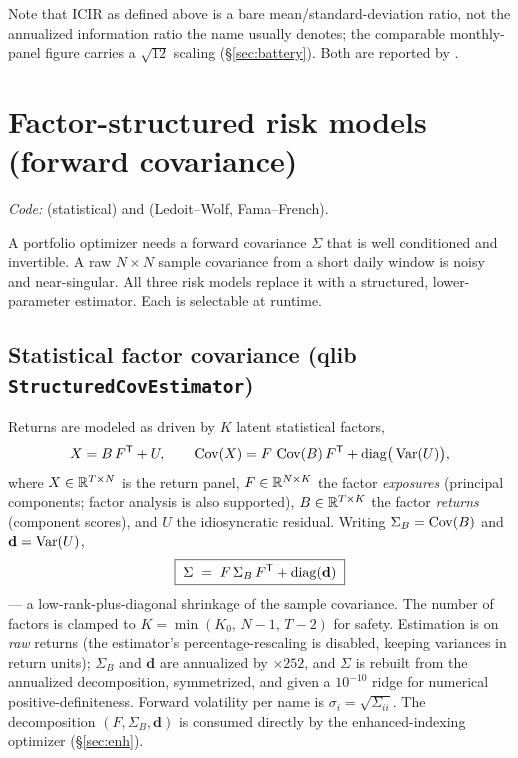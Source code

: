 \documentclass[11pt]{article}
\begin{document}
Note that $\mathrm{ICIR}$ as defined above is a bare mean/standard-deviation ratio, not
the annualized information ratio the name usually denotes; the comparable monthly-panel
figure carries a $\sqrt{12}$ scaling (\S\ref{sec:battery}). Both are reported by
.

\section{Factor-structured risk models (forward covariance)}
\label{sec:risk}
\emph{Code:}  (statistical) and
 (Ledoit--Wolf, Fama--French).

A portfolio optimizer needs a forward covariance $\Sigma$ that is well conditioned
and invertible. A raw $N\times N$ sample covariance from a short daily window is
noisy and near-singular. All three risk models replace it with a structured,
lower-parameter estimator. Each is selectable at runtime.

\subsection{Statistical factor covariance (qlib \texttt{StructuredCovEstimator})}
Returns are modeled as driven by $K$ latent statistical factors,
\begin{equation}
  X = B\,F^{\mathsf{T}} + U, \qquad
  \operatorname{Cov}(X) = F\,\operatorname{Cov}(B)\,F^{\mathsf{T}} + \operatorname{diag}\!\big(\operatorname{Var}(U)\big),
\end{equation}
where $X\in\mathbb{R}^{T\times N}$ is the return panel, $F\in\mathbb{R}^{N\times K}$ the factor
\emph{exposures} (principal components; factor analysis is also supported),
$B\in\mathbb{R}^{T\times K}$ the factor \emph{returns} (component scores), and $U$ the
idiosyncratic residual. Writing $\Sigma_B=\operatorname{Cov}(B)$ and $\mathbf d=\operatorname{Var}(U)$,
\begin{equation}
  \boxed{\;\Sigma \;=\; F\,\Sigma_B\,F^{\mathsf{T}} + \operatorname{diag}(\mathbf d)\;}
\end{equation}
--- a low-rank-plus-diagonal shrinkage of the sample covariance. The number of
factors is clamped to $K=\min(K_0,\,N-1,\,T-2)$ for safety. Estimation is on
\emph{raw} returns (the estimator's percentage-rescaling is disabled, keeping
variances in return units); $\Sigma_B$ and $\mathbf d$ are annualized by $\times
252$, and $\Sigma$ is rebuilt from the annualized decomposition, symmetrized, and
given a $10^{-10}$ ridge for numerical positive-definiteness. Forward volatility
per name is $\sigma_i=\sqrt{\Sigma_{ii}}$. The decomposition $(F,\Sigma_B,\mathbf
d)$ is consumed directly by the enhanced-indexing optimizer (\S\ref{sec:enh}).
\end{document}
